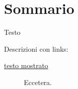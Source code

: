 \newpage

{}
\chapter*{Sommario\label{sec:sommario}}

Testo

Descrizioni con links:
\begin{description}
    \item[{\hyperref[label]{testo mostrato}}] Eccetera.
\end{description}
